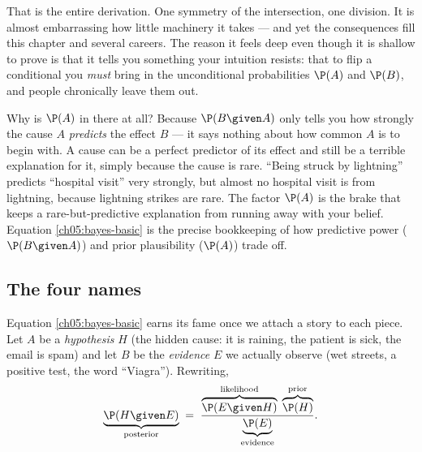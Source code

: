 That is the entire derivation. One symmetry of the intersection, one division. It is
almost embarrassing how little machinery it takes --- and yet the consequences fill this
chapter and several careers. The reason it feels deep even though it is shallow to prove
is that it tells you something your intuition resists: that to flip a conditional you
\emph{must} bring in the unconditional probabilities $\P(A)$ and $\P(B)$, and people
chronically leave them out.

\begin{whybox}
Why is $\P(A)$ in there at all? Because $\P(B\given A)$ only tells you how strongly the
cause $A$ \emph{predicts} the effect $B$ --- it says nothing about how common $A$ is to
begin with. A cause can be a perfect predictor of its effect and still be a terrible
explanation for it, simply because the cause is rare. ``Being struck by lightning''
predicts ``hospital visit'' very strongly, but almost no hospital visit is from
lightning, because lightning strikes are rare. The factor $\P(A)$ is the brake that
keeps a rare-but-predictive explanation from running away with your belief. Equation
\eqref{ch05:bayes-basic} is the precise bookkeeping of how predictive power
($\P(B\given A)$) and prior plausibility ($\P(A)$) trade off.
\end{whybox}

\subsection{The four names}

Equation \eqref{ch05:bayes-basic} earns its fame once we attach a story to each piece.
Let $A$ be a \emph{hypothesis} $H$ (the hidden cause: it is raining, the patient is
sick, the email is spam) and let $B$ be the \emph{evidence} $E$ we actually observe (wet
streets, a positive test, the word ``Viagra''). Rewriting,
\begin{equation}
  \underbrace{\P(H \given E)}_{\text{posterior}}
  \;=\;
  \frac{\overbrace{\P(E \given H)}^{\text{likelihood}}\;\overbrace{\P(H)}^{\text{prior}}}
       {\underbrace{\P(E)}_{\text{evidence}}}.
  \label{ch05:bayes-named}
\end{equation}

